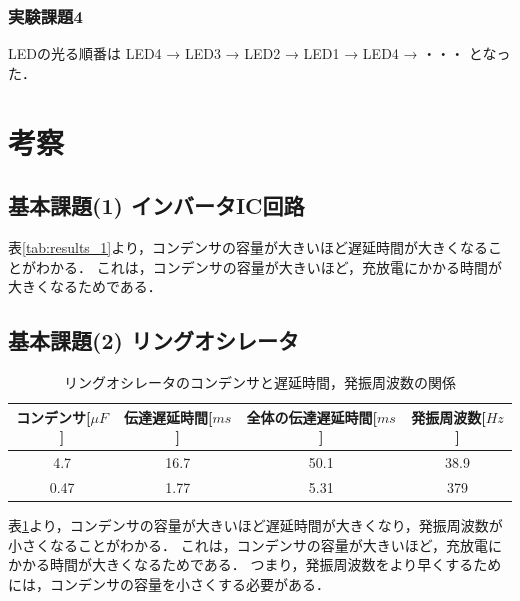 \documentclass{ltjsarticle}
\begin{document}
\subsubsection{実験課題4}
LEDの光る順番は LED4 → LED3 → LED2 → LED1 → LED4 → ・・・ となった．

\section{考察}
\subsection{基本課題(1) インバータIC回路}
表\ref{tab:results_1}より，コンデンサの容量が大きいほど遅延時間が大きくなることがわかる．
これは，コンデンサの容量が大きいほど，充放電にかかる時間が大きくなるためである．

\subsection{基本課題(2) リングオシレータ}
\begin{table}[H]
\centering
\begin{tabular}{|c|c|c|c|}
\hline
コンデンサ[${\mu F}$] & 伝達遅延時間[${ms}$] & 全体の伝達遅延時間[${ms}$] & 発振周波数[${Hz}$] \\ \hline
4.7 & 16.7 & 50.1 & 38.9  \\ \hline
0.47 & 1.77 & 5.31 & 379 \\ \hline
\end{tabular}
\caption{リングオシレータのコンデンサと遅延時間，発振周波数の関係}
\label{tab:discussion_results}
\end{table}

表\ref{tab:discussion_results}より，コンデンサの容量が大きいほど遅延時間が大きくなり，発振周波数が小さくなることがわかる．
これは，コンデンサの容量が大きいほど，充放電にかかる時間が大きくなるためである．
つまり，発振周波数をより早くするためには，コンデンサの容量を小さくする必要がある．
\end{document}
